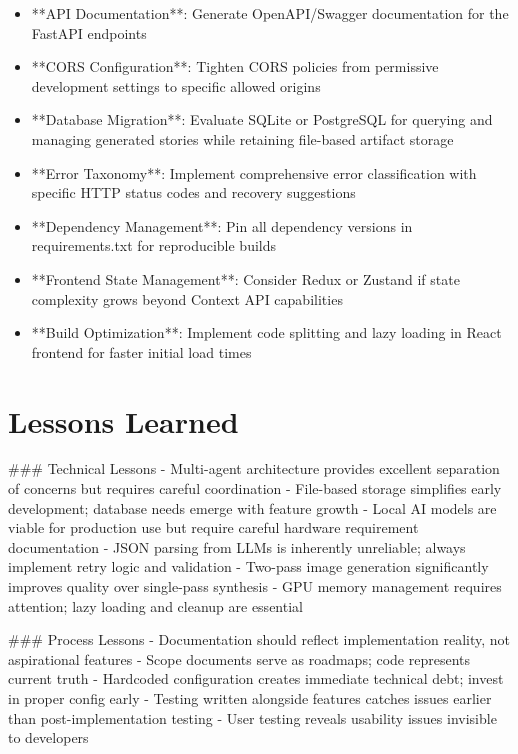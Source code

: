\begin{itemize}
    \item **API Documentation**: Generate OpenAPI/Swagger documentation for the FastAPI endpoints
    \item **CORS Configuration**: Tighten CORS policies from permissive development settings to specific allowed origins
    \item **Database Migration**: Evaluate SQLite or PostgreSQL for querying and managing generated stories while retaining file-based artifact storage
    \item **Error Taxonomy**: Implement comprehensive error classification with specific HTTP status codes and recovery suggestions
    \item **Dependency Management**: Pin all dependency versions in requirements.txt for reproducible builds
    \item **Frontend State Management**: Consider Redux or Zustand if state complexity grows beyond Context API capabilities
    \item **Build Optimization**: Implement code splitting and lazy loading in React frontend for faster initial load times
\end{itemize}

\section{Lessons Learned}

### Technical Lessons
- Multi-agent architecture provides excellent separation of concerns but requires careful coordination
- File-based storage simplifies early development; database needs emerge with feature growth
- Local AI models are viable for production use but require careful hardware requirement documentation
- JSON parsing from LLMs is inherently unreliable; always implement retry logic and validation
- Two-pass image generation significantly improves quality over single-pass synthesis
- GPU memory management requires attention; lazy loading and cleanup are essential

### Process Lessons
- Documentation should reflect implementation reality, not aspirational features
- Scope documents serve as roadmaps; code represents current truth
- Hardcoded configuration creates immediate technical debt; invest in proper config early
- Testing written alongside features catches issues earlier than post-implementation testing
- User testing reveals usability issues invisible to developers

